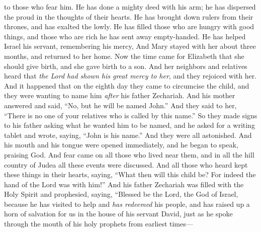 \begin{biblechapter}
to those who fear him.
\verse He has done a mighty deed with his arm; 
he has dispersed the proud in the thoughts of their hearts.
\verse He has brought down rulers from their thrones, 
and has exalted the lowly.
\verse He has filled those who are hungry with good things, 
and those who are rich he has sent away empty-handed.
\verse He has helped Israel his servant, 
remembering his mercy,
\verse And Mary stayed with her about three months, and returned to her home.
 Now the time came for Elizabeth that she should give birth, and she gave birth to a son.
\verse And her neighbors and relatives heard that \textit{the Lord had shown his great mercy to her}, and they rejoiced with her.
\verse And it happened that on the eighth day they came to circumcise the child, and they were wanting to name him \textit{after} his father Zechariah.
\verse And his mother answered and said, “No, but he will be named John.”
\verse And they said to her, “There is no one of your relatives who is called by this name.”
\verse So they made signs to his father asking what he wanted him to be named,
\verse and he asked for a writing tablet and wrote, saying, “John is his name.” And they were all astonished.
\verse And his mouth and his tongue were opened immediately, and he began to speak, praising God.
\verse And fear came on all those who lived near them, and in all the hill country of Judea all these events were discussed.
\verse And all those who heard kept these things in their hearts, saying, “What then will this child be? For indeed the hand of the Lord was with him!”
 And his father Zechariah was filled with the Holy Spirit and prophesied, saying,
\verse “Blessed be the Lord, the God of Israel, 
because he has visited to help and \textit{has redeemed} his people,
\verse and has raised up a horn of salvation for us 
in the house of his servant David,
\verse just as he spoke through the mouth of his holy prophets from earliest times—

\end{biblechapter}

